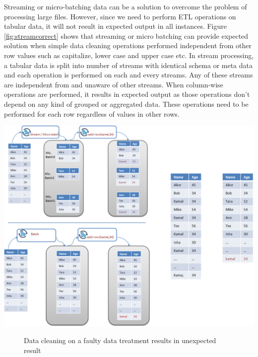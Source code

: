 Streaming or micro-batching data can be a solution to overcome the problem of processing large files. However, since we need to perform ETL operations on tabular data, it will not result in expected output in all instances. Figure \ref{fig:streamcorrect} shows that streaming or micro batching can provide expected solution when simple data cleaning operations performed independent from other row values such as capitalize, lower case and upper case etc. In stream processing, a tabular data is split into number of streams with identical schema or meta data and each operation is performed on each and every streams. Any of these streams are independent from and unaware of other streams. When column-wise operations are performed, it results in expected output as those operations don't depend on any kind of grouped or aggregated data. These operations need to be performed for each row regardless of values in other rows. 
 \begin{center}
	\includegraphics[width=38em]{./Figures/batch-cleaning-wrong}
	\begin{figure}[htbp]
    \caption{Data cleaning on a faulty data treatment results in unexpected result}
    \label{fig:stream-wrong}
	\end{figure}
\end{center}
